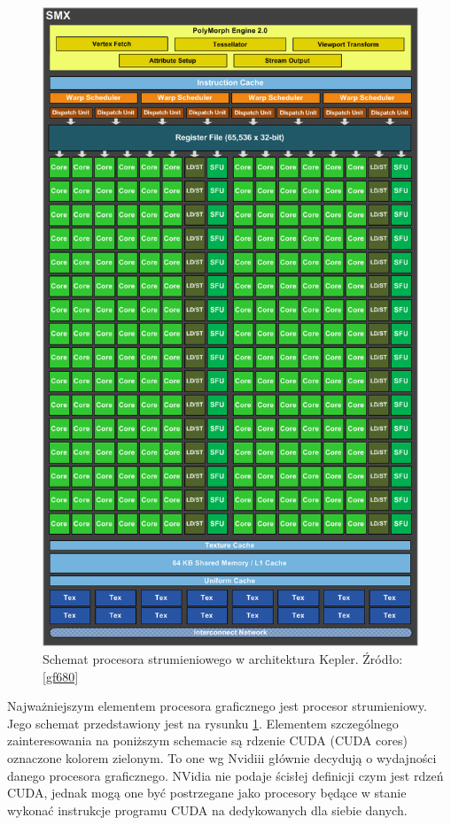 \begin{figure}[H]
\centering
\includegraphics[scale=0.3]{images/kepler-SMX-overview.png}
\caption{Schemat procesora strumieniowego w architektura Kepler. Źródło: \ref{gf680}}
\label{hier2}
\end{figure}

Najważniejszym elementem procesora graficznego jest procesor strumieniowy.
Jego schemat przedstawiony jest na rysunku \ref{hier2}. Elementem szczególnego 
zainteresowania na poniższym schemacie są rdzenie CUDA (CUDA cores) oznaczone
kolorem zielonym. To one wg Nvidiii głównie decydują o wydajności danego
procesora graficznego. NVidia nie podaje ścisłej definicji czym jest rdzeń CUDA,
		  jednak mogą one być postrzegane jako procesory będące w stanie wykonać
		  instrukcje programu CUDA na dedykowanych dla siebie danych. 

